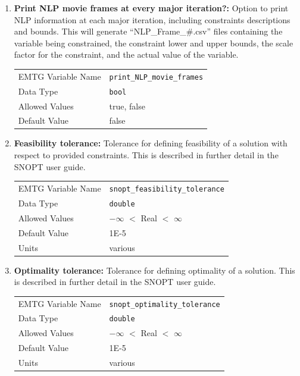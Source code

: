 \begin{enumerate}
    \item \textbf{Print \ac{NLP} movie frames at every major iteration?:} Option to print \ac{NLP} information at each major iteration, including constraints descriptions and bounds. This will generate ``\ac{NLP}\_Frame\_\#.csv'' files containing the variable being constrained, the constraint lower and upper bounds, the scale factor for the constraint, and the actual value of the variable.
        \begin{table}[H]
            \hspace{2cm}
            \begin{tabular}{lp{5cm}}
            \ac{EMTG} Variable Name & \verb|print_NLP_movie_frames| \\
            Data Type & \verb|bool| \\
            Allowed Values & true, false \\
            Default Value & false \\
            \end{tabular}
        \end{table}

    \item \textbf{Feasibility tolerance:} Tolerance for defining feasibility of a solution with respect to provided constraints. This is described in further detail in the \ac{SNOPT} user guide.
    \begin{table}[H]
        \hspace{2cm}
        \begin{tabular}{lp{5cm}}
        \ac{EMTG} Variable Name & \verb|snopt_feasibility_tolerance| \\
        Data Type & \verb|double| \\
        Allowed Values & $-\infty$ $<$ Real $<$ $\infty$ \\
        Default Value & 1E-5 \\
        Units & various
        \end{tabular}
    \end{table}
    
    \item \textbf{Optimality tolerance:} Tolerance for defining optimality of a solution. This is described in further detail in the \ac{SNOPT} user guide.
    \begin{table}[H]
        \hspace{2cm}
        \begin{tabular}{lp{5cm}}
        \ac{EMTG} Variable Name & \verb|snopt_optimality_tolerance| \\
        Data Type & \verb|double| \\
        Allowed Values & $-\infty$ $<$ Real $<$ $\infty$ \\
        Default Value & 1E-5 \\
        Units & various
        \end{tabular}
    \end{table}
    

\end{enumerate}
